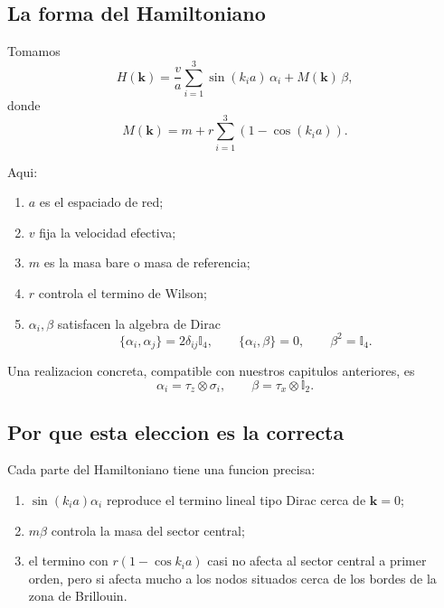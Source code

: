\subsection{La forma del Hamiltoniano}
Tomamos
\begin{equation}
H(\bm{k})=
\frac{v}{a}\sum_{i=1}^3 \sin(k_i a)\,\alpha_i
+
M(\bm{k})\,\beta,
\label{c14:eq:wilsondirac}
\end{equation}
donde
\begin{equation}
M(\bm{k}) = m + r\sum_{i=1}^3 \left(1-\cos(k_i a)\right).
\label{c14:eq:massfunction}
\end{equation}

Aqui:
\begin{enumerate}[label=\arabic*.]
    \item \(a\) es el espaciado de red;
    \item \(v\) fija la velocidad efectiva;
    \item \(m\) es la masa bare o masa de referencia;
    \item \(r\) controla el termino de Wilson;
    \item \(\alpha_i,\beta\) satisfacen la algebra de Dirac
    \[
    \{\alpha_i,\alpha_j\}=2\delta_{ij}\mathbb{I}_4,
    \qquad
    \{\alpha_i,\beta\}=0,
    \qquad
    \beta^2=\mathbb{I}_4.
    \]
\end{enumerate}

Una realizacion concreta, compatible con nuestros capitulos anteriores, es
\begin{equation}
\alpha_i=\tau_z\otimes \sigma_i,
\qquad
\beta=\tau_x\otimes \mathbb{I}_2.
\end{equation}

\subsection{Por que esta eleccion es la correcta}
Cada parte del Hamiltoniano tiene una funcion precisa:
\begin{enumerate}[label=\arabic*.]
    \item \(\sin(k_i a)\alpha_i\) reproduce el termino lineal tipo Dirac cerca de \(\bm{k}=0\);
    \item \(m\beta\) controla la masa del sector central;
    \item el termino con \(r(1-\cos k_i a)\) casi no afecta al sector central a primer orden, pero si afecta mucho a los nodos situados cerca de los bordes de la zona de Brillouin.
\end{enumerate}

